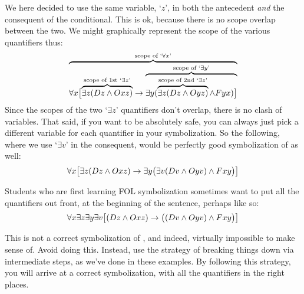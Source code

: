 We here decided to use the same variable, `$z$', in both the antecedent \emph{and} the consequent of the conditional. This is ok, because there is no scope overlap between the two. We might graphically represent the scope of the various quantifiers thus:
$$\overbrace{\forall x\bigl[\overbrace{\exists z(Dz \wedge Oxz)}^{\text{scope of 1st `}\exists z\text{'}}\rightarrow \overbrace{\exists y(\overbrace{\exists z(Dz \wedge Oyz)}^{\text{scope of 2nd `}\exists z\text{'}}\wedge Fyx)\bigr]}^{\text{scope of `}\exists y\text{'}}}^{\text{scope of `}\forall x\text{'}}$$
Since the scopes of the two `$\exists z$' quantifiers don't overlap, there is no clash of variables.   That said, if you want to be absolutely safe, you can always just pick a different variable for each quantifier in your symbolization.  So the following, where we use `$\exists v$' in the consequent, would be perfectly good symbolization of  as well:
$$\forall x\bigl[\exists z(Dz \wedge Oxz)\rightarrow\exists y\bigl(\exists v(Dv \wedge Oyv)\wedge Fxy\bigr)\bigr]$$

%
Students who are first learning FOL symbolization sometimes want to put all the quantifiers out front, at the beginning of the sentence, perhaps like so:
$$\forall x\exists z \exists y \exists v\bigl[(Dz \wedge Oxz)\rightarrow \bigl((Dv \wedge Oyv)\wedge Fxy\bigr)\bigr]$$

This is not a correct symbolization of , and indeed, virtually impossible to make sense of.  Avoid doing this.  Instead, use the strategy of breaking things down via intermediate steps, as we've done in these examples.  By following this strategy, you will arrive at a correct symbolization, with all the quantifiers in the right places.

